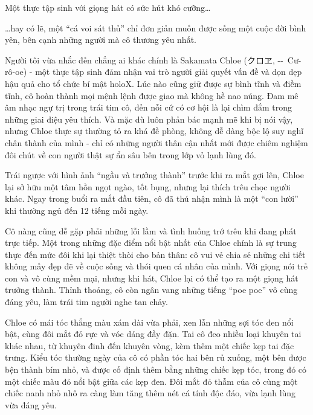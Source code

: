 \documentclass[../main.tex]{subfiles}
\begin{document}
Một thực tập sinh với giọng hát có sức hút khó cưỡng\dots

\dots hay có lẽ, một ``cá voi sát thủ'' chỉ đơn giản muốn được sống một cuộc đời bình yên, bên cạnh những người mà cô thương yêu nhất.

\chrint


Người tôi vừa nhắc đến chẳng ai khác chính là Sakamata Chloe (クロヱ, --\ Cư-rô-oe) - một thực tập sinh đảm nhận vai trò người giải quyết vấn đề và dọn dẹp hậu quả cho tổ chức bí mật holoX. Lúc nào cũng giữ được sự bình tĩnh và điềm tĩnh, cô hoàn thành mọi mệnh lệnh được giao mà không hề nao núng. Đam mê âm nhạc ngự trị trong trái tim cô, đến nỗi cứ có cơ hội là lại chìm đắm trong những giai điệu yêu thích. Và mặc dù luôn phản bác mạnh mẽ khi bị nói vậy, nhưng Chloe thực sự thường tỏ ra khá đề phòng, không dễ dàng bộc lộ suy nghĩ chân thành của mình - chỉ có những người thân cận nhất mới được chiêm nghiệm đôi chút về con người thật sự ẩn sâu bên trong lớp vỏ lạnh lùng đó.

Trái ngược với hình ảnh ``ngầu và trưởng thành'' trước khi ra mắt gợi lên, Chloe lại sở hữu một tâm hồn ngọt ngào, tốt bụng, nhưng lại thích trêu chọc người khác. Ngay trong buổi ra mắt đầu tiên, cô đã thú nhận mình là một ``con lười'' khi thường ngủ đến 12 tiếng mỗi ngày.

Cô nàng cũng dễ gặp phải những lỗi lầm và tình huống trớ trêu khi đang phát trực tiếp. Một trong những đặc điểm nổi bật nhất của Chloe chính là sự trung thực đến mức đôi khi lại thiệt thòi cho bản thân: cô vui vẻ chia sẻ những chi tiết không mấy đẹp đẽ về cuộc sống và thói quen cá nhân của mình. Với giọng nói trẻ con và vô cùng mềm mại, nhưng khi hát, Chloe lại có thể tạo ra một giọng hát trưởng thành. Thỉnh thoảng, cô còn ngân vang những tiếng ``poe poe'' vô cùng đáng yêu, làm trái tim người nghe tan chảy.

Chloe có mái tóc thẳng màu xám dài vừa phải, xen lẫn những sợi tóc đen nổi bật, cùng đôi mắt đỏ rực và vóc dáng đầy đặn. Tai cô đeo nhiều loại khuyên tai khác nhau, từ khuyên đinh đến khuyên vòng, kèm thêm một chiếc kẹp tai đặc trưng. Kiểu tóc thường ngày của cô có phần tóc hai bên rủ xuống, một bên được bện thành bím nhỏ, và được cố định thêm bằng những chiếc kẹp tóc, trong đó có một chiếc màu đỏ nổi bật giữa các kẹp đen. Đôi mắt đỏ thẫm của cô cùng một chiếc nanh nhỏ nhô ra càng làm tăng thêm nét cá tính độc đáo, vừa lạnh lùng vừa đáng yêu.
\end{document}

